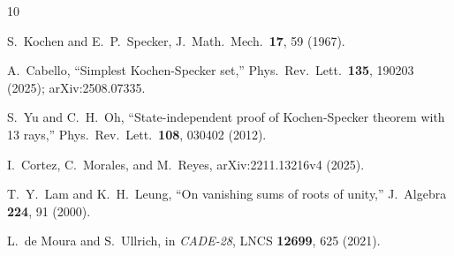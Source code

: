 \documentclass[twocolumn,prl,superscriptaddress,nofootinbib]{revtex4-2}
\begin{document}
\begin{thebibliography}{10}

S.~Kochen and E.~P.~Specker,
J.\ Math.\ Mech.\ \textbf{17}, 59 (1967).

A.~Cabello,
``Simplest Kochen-Specker set,''
Phys.\ Rev.\ Lett.\ \textbf{135}, 190203 (2025); arXiv:2508.07335.

S.~Yu and C.~H.~Oh,
``State-independent proof of Kochen-Specker theorem with 13 rays,''
Phys.\ Rev.\ Lett.\ \textbf{108}, 030402 (2012).

I.~Cortez, C.~Morales, and M.~Reyes,
arXiv:2211.13216v4 (2025).

T.~Y.~Lam and K.~H.~Leung,
``On vanishing sums of roots of unity,''
J.\ Algebra \textbf{224}, 91 (2000).

L.~de Moura and S.~Ullrich,
in \textit{CADE-28}, LNCS \textbf{12699}, 625 (2021).

\end{thebibliography}
\end{document}
